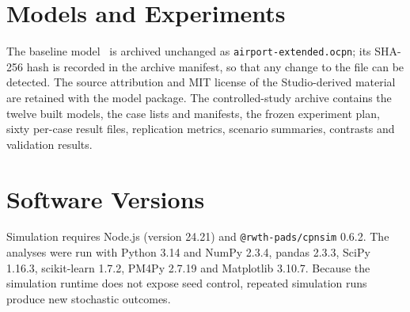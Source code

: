 \section{Models and Experiments}
The baseline model~\cite{ocpn_studio} is archived unchanged as \texttt{airport-extended.ocpn}; its SHA-256 hash is recorded in the archive manifest, so that any change to the file can be detected. The source attribution and MIT license of the Studio-derived material are retained with the model package. The controlled-study archive contains the twelve built models, the case lists and manifests, the frozen experiment plan, sixty per-case result files, replication metrics, scenario summaries, contrasts and validation results.

\section{Software Versions}
Simulation requires Node.js (version 24.21) and \texttt{@rwth-pads/cpnsim} 0.6.2. The analyses were run with Python 3.14 and NumPy 2.3.4, pandas 2.3.3, SciPy 1.16.3, scikit-learn 1.7.2, PM4Py 2.7.19 and Matplotlib 3.10.7. Because the simulation runtime does not expose seed control, repeated simulation runs produce new stochastic outcomes.
